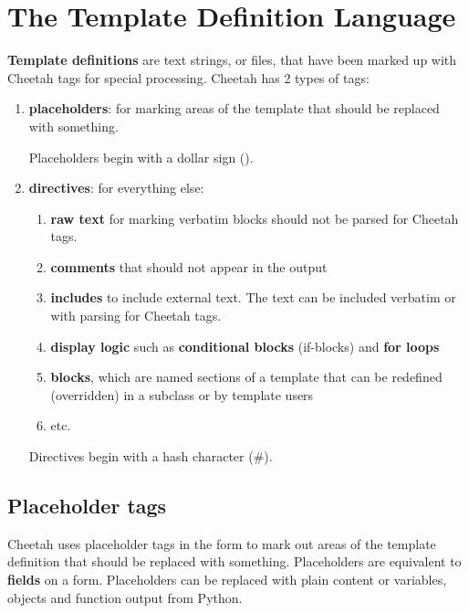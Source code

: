 \section{The Template Definition Language}

{\bf Template definitions} are text strings, or files, that have been marked up
with Cheetah tags for special processing.  Cheetah has 2 types of tags:

\begin{enumerate}
\item {\bf placeholders}: for marking areas of the template that should be
     replaced with something. 
     
     Placeholders begin with a dollar sign ().

\item {\bf directives}: for everything else:
     \begin{enumerate}   %
     \item {\bf raw text} for marking verbatim blocks should not be parsed for
          Cheetah tags.
     \item {\bf comments} that should not appear in the output
     \item {\bf includes} to include external text.  The text can be included
          verbatim or with parsing for Cheetah tags.
     \item {\bf display logic} such as {\bf conditional blocks} (if-blocks) and
          {\bf for loops}
     \item {\bf blocks}, which are named sections of a template that can be
          redefined (overridden) in a subclass or by template users
     \item etc.
     \end{enumerate}  %

     Directives begin with a hash character (\#).

\end{enumerate}


\subsection{Placeholder tags}
Cheetah uses placeholder tags in the form  to mark out
areas of the template definition that should be replaced with something.  Placeholders are
equivalent to {\bf fields} on a form.  Placeholders can be replaced with plain
content or variables, objects and function output from Python.

